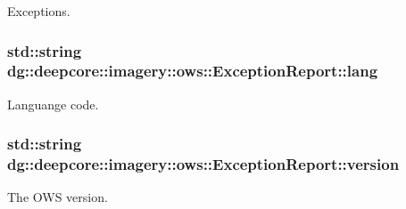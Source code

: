 Exceptions. 

\subsubsection[{\texorpdfstring{lang}{lang}}]{\setlength{\rightskip}{0pt plus 5cm}std\+::string dg\+::deepcore\+::imagery\+::ows\+::\+Exception\+Report\+::lang}\hypertarget{structdg_1_1deepcore_1_1imagery_1_1ows_1_1_exception_report_a3cc19f5f1be081777526f2f32872f787}{}\label{structdg_1_1deepcore_1_1imagery_1_1ows_1_1_exception_report_a3cc19f5f1be081777526f2f32872f787}


Languange code. 

\subsubsection[{\texorpdfstring{version}{version}}]{\setlength{\rightskip}{0pt plus 5cm}std\+::string dg\+::deepcore\+::imagery\+::ows\+::\+Exception\+Report\+::version}\hypertarget{structdg_1_1deepcore_1_1imagery_1_1ows_1_1_exception_report_aee7406892476149864fb6a4d683b8dbc}{}\label{structdg_1_1deepcore_1_1imagery_1_1ows_1_1_exception_report_aee7406892476149864fb6a4d683b8dbc}


The O\+WS version. 

